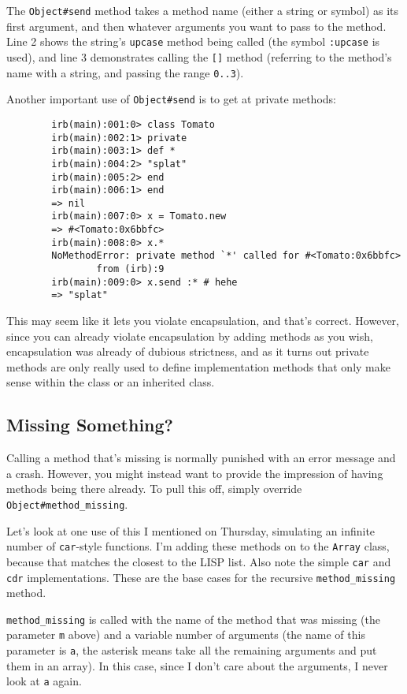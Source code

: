 \documentclass[12pt]{article}
\begin{document}
	The \verb|Object#send| method takes a method name (either a string or symbol) as its first argument, and then whatever arguments you want to pass to the method.  Line 2 shows the string's \verb|upcase| method being called (the symbol \verb|:upcase| is used), and line 3 demonstrates calling the \verb|[]| method (referring to the method's name with a string, and passing the range \verb|0..3|).
	
	Another important use of \verb|Object#send| is to get at private methods:
	\begin{verbatim}
		irb(main):001:0> class Tomato
		irb(main):002:1> private
		irb(main):003:1> def *
		irb(main):004:2> "splat"
		irb(main):005:2> end
		irb(main):006:1> end
		=> nil
		irb(main):007:0> x = Tomato.new
		=> #<Tomato:0x6bbfc>
		irb(main):008:0> x.*
		NoMethodError: private method `*' called for #<Tomato:0x6bbfc>
		        from (irb):9
		irb(main):009:0> x.send :* # hehe
		=> "splat"
	\end{verbatim}
	This may seem like it lets you violate encapsulation, and that's correct.  However, since you can already violate encapsulation by adding methods as you wish, encapsulation was already of dubious strictness, and as it turns out private methods are only really used to define implementation methods that only make sense within the class or an inherited class.
	
	\subsection{Missing Something?}
	
	Calling a method that's missing is normally punished with an error message and a crash.  However, you might instead want to provide the impression of having methods being there already.  To pull this off, simply override \verb|Object#method_missing|.
	
	Let's look at one use of this I mentioned on Thursday, simulating an infinite number of \verb|car|-style functions.
	I'm adding these methods on to the \verb|Array| class, because that matches the closest to the LISP list.  Also note the simple \verb|car| and \verb|cdr| implementations.  These are the base cases for the recursive \verb|method_missing| method.
	
	\verb|method_missing| is called with the name of the method that was missing (the parameter \verb|m| above) and a variable number of arguments (the name of this parameter is \verb|a|, the asterisk means take all the remaining arguments and put them in an array).  In this case, since I don't care about the arguments, I never look at \verb|a| again.
	
\end{document}
